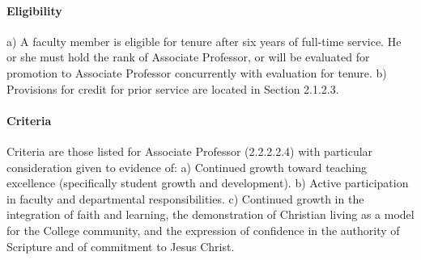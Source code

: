 \documentclass[letterpaper, 11pt]{article}
\begin{document}
			\paragraph{Eligibility}
				a) A faculty member is eligible for tenure after six years of full-time service.  He or she must hold the rank of Associate Professor, or will be evaluated for promotion to Associate Professor concurrently with evaluation for tenure.
				b) Provisions for credit for prior service are located in Section 2.1.2.3.
			\paragraph{Criteria}
				Criteria are those listed for Associate Professor (2.2.2.2.4) with particular consideration given to evidence of:
				a) Continued growth toward teaching excellence (specifically student growth and development).
				b) Active participation in faculty and departmental responsibilities.
				c) Continued growth in the integration of faith and learning, the demonstration of Christian living as a model for the College community, and the expression of confidence in the authority of Scripture and of commitment to Jesus Christ.
\end{document}
